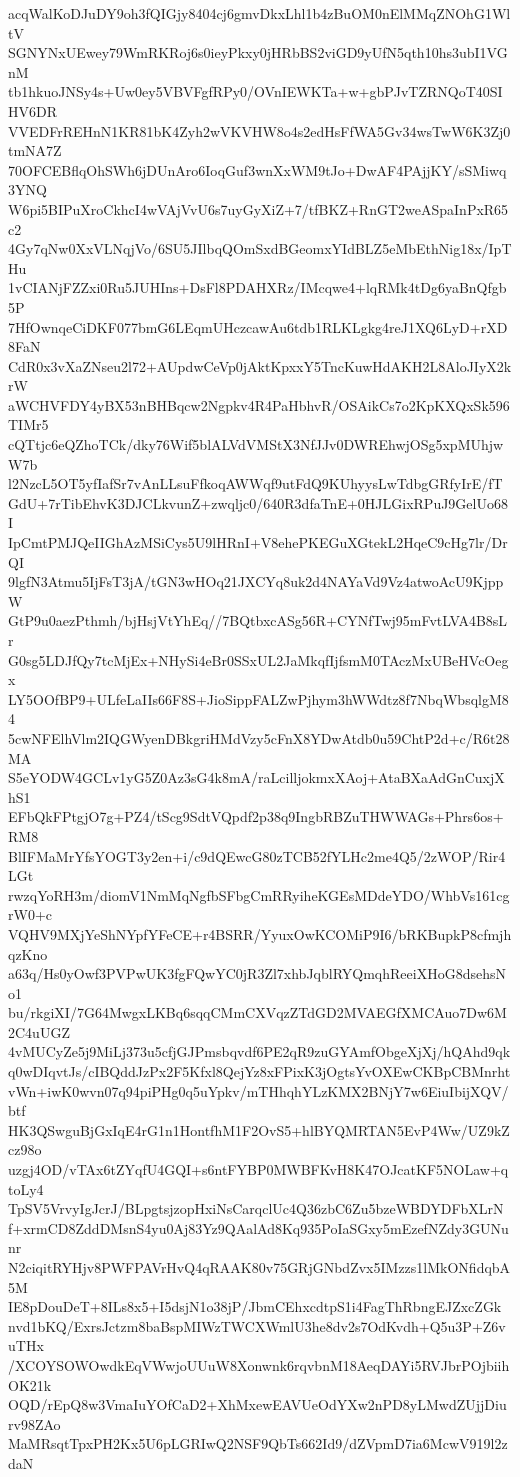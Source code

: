 acqWalKoDJuDY9oh3fQIGjy8404cj6gmvDkxLhl1b4zBuOM0nElMMqZNOhG1WltV
SGNYNxUEwey79WmRKRoj6s0ieyPkxy0jHRbBS2viGD9yUfN5qth10hs3ubI1VGnM
tb1hkuoJNSy4s+Uw0ey5VBVFgfRPy0/OVnIEWKTa+w+gbPJvTZRNQoT40SIHV6DR
VVEDFrREHnN1KR81bK4Zyh2wVKVHW8o4s2edHsFfWA5Gv34wsTwW6K3Zj0tmNA7Z
70OFCEBflqOhSWh6jDUnAro6IoqGuf3wnXxWM9tJo+DwAF4PAjjKY/sSMiwq3YNQ
W6pi5BIPuXroCkhcI4wVAjVvU6s7uyGyXiZ+7/tfBKZ+RnGT2weASpaInPxR65c2
4Gy7qNw0XxVLNqjVo/6SU5JIlbqQOmSxdBGeomxYIdBLZ5eMbEthNig18x/IpTHu
1vCIANjFZZxi0Ru5JUHIns+DsFl8PDAHXRz/IMcqwe4+lqRMk4tDg6yaBnQfgb5P
7HfOwnqeCiDKF077bmG6LEqmUHczcawAu6tdb1RLKLgkg4reJ1XQ6LyD+rXD8FaN
CdR0x3vXaZNseu2l72+AUpdwCeVp0jAktKpxxY5TncKuwHdAKH2L8AloJIyX2krW
aWCHVFDY4yBX53nBHBqcw2Ngpkv4R4PaHbhvR/OSAikCs7o2KpKXQxSk596TIMr5
cQTtjc6eQZhoTCk/dky76Wif5blALVdVMStX3NfJJv0DWREhwjOSg5xpMUhjwW7b
l2NzcL5OT5yfIafSr7vAnLLsuFfkoqAWWqf9utFdQ9KUhyysLwTdbgGRfyIrE/fT
GdU+7rTibEhvK3DJCLkvunZ+zwqljc0/640R3dfaTnE+0HJLGixRPuJ9GelUo68I
IpCmtPMJQeIIGhAzMSiCys5U9lHRnI+V8ehePKEGuXGtekL2HqeC9cHg7lr/DrQI
9lgfN3Atmu5IjFsT3jA/tGN3wHOq21JXCYq8uk2d4NAYaVd9Vz4atwoAcU9KjppW
GtP9u0aezPthmh/bjHsjVtYhEq//7BQtbxcASg56R+CYNfTwj95mFvtLVA4B8sLr
G0sg5LDJfQy7tcMjEx+NHySi4eBr0SSxUL2JaMkqfIjfsmM0TAczMxUBeHVcOegx
LY5OOfBP9+ULfeLaIIs66F8S+JioSippFALZwPjhym3hWWdtz8f7NbqWbsqlgM84
5cwNFElhVlm2IQGWyenDBkgriHMdVzy5cFnX8YDwAtdb0u59ChtP2d+c/R6t28MA
S5eYODW4GCLv1yG5Z0Az3sG4k8mA/raLcilljokmxXAoj+AtaBXaAdGnCuxjXhS1
EFbQkFPtgjO7g+PZ4/tScg9SdtVQpdf2p38q9IngbRBZuTHWWAGs+Phrs6os+RM8
BlIFMaMrYfsYOGT3y2en+i/c9dQEwcG80zTCB52fYLHc2me4Q5/2zWOP/Rir4LGt
rwzqYoRH3m/diomV1NmMqNgfbSFbgCmRRyiheKGEsMDdeYDO/WhbVs161cgrW0+c
VQHV9MXjYeShNYpfYFeCE+r4BSRR/YyuxOwKCOMiP9I6/bRKBupkP8cfmjhqzKno
a63q/Hs0yOwf3PVPwUK3fgFQwYC0jR3Zl7xhbJqblRYQmqhReeiXHoG8dsehsNo1
bu/rkgiXI/7G64MwgxLKBq6sqqCMmCXVqzZTdGD2MVAEGfXMCAuo7Dw6M2C4uUGZ
4vMUCyZe5j9MiLj373u5cfjGJPmsbqvdf6PE2qR9zuGYAmfObgeXjXj/hQAhd9qk
q0wDIqvtJs/cIBQddJzPx2F5Kfxl8QejYz8xFPixK3jOgtsYvOXEwCKBpCBMnrht
vWn+iwK0wvn07q94piPHg0q5uYpkv/mTHhqhYLzKMX2BNjY7w6EiuIbijXQV/btf
HK3QSwguBjGxIqE4rG1n1HontfhM1F2OvS5+hlBYQMRTAN5EvP4Ww/UZ9kZcz98o
uzgj4OD/vTAx6tZYqfU4GQI+s6ntFYBP0MWBFKvH8K47OJcatKF5NOLaw+qtoLy4
TpSV5VrvyIgJcrJ/BLpgtsjzopHxiNsCarqclUc4Q36zbC6Zu5bzeWBDYDFbXLrN
f+xrmCD8ZddDMsnS4yu0Aj83Yz9QAalAd8Kq935PoIaSGxy5mEzefNZdy3GUNunr
N2ciqitRYHjv8PWFPAVrHvQ4qRAAK80v75GRjGNbdZvx5IMzzs1lMkONfidqbA5M
IE8pDouDeT+8ILs8x5+I5dsjN1o38jP/JbmCEhxcdtpS1i4FagThRbngEJZxcZGk
nvd1bKQ/ExrsJctzm8baBspMIWzTWCXWmlU3he8dv2s7OdKvdh+Q5u3P+Z6vuTHx
/XCOYSOWOwdkEqVWwjoUUuW8Xonwnk6rqvbnM18AeqDAYi5RVJbrPOjbiihOK21k
OQD/rEpQ8w3VmaIuYOfCaD2+XhMxewEAVUeOdYXw2nPD8yLMwdZUjjDiurv98ZAo
MaMRsqtTpxPH2Kx5U6pLGRIwQ2NSF9QbTs662Id9/dZVpmD7ia6McwV919l2zdaN
